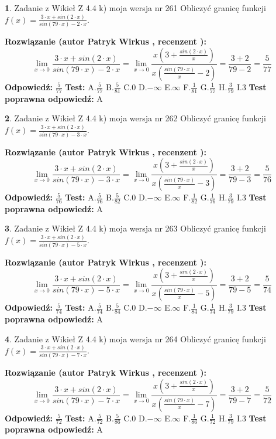\documentclass[12pt, a4paper]{article}
\theoremstyle{definition} %
\newtheorem{zad}{}
\newcommand{\zadStart}[1]{\begin{zad}#1\newline}
\newcommand{\zadStop}{\end{zad}}
\newcommand{\rozwStart}[2]{\noindent \textbf{Rozwiązanie (autor #1 , recenzent #2): }\newline}
\newcommand{\rozwStop}{\newline}
\newcommand{\odpStart}{\noindent \textbf{Odpowiedź:}\newline}
\newcommand{\odpStop}{\newline}
\newcommand{\testStart}{\noindent \textbf{Test:}\newline}
\newcommand{\testStop}{\newline}
\newcommand{\kluczStart}{\noindent \textbf{Test poprawna odpowiedź:}\newline}
\newcommand{\kluczStop}{\newline}
\begin{document}
\zadStart{Zadanie z Wikieł Z 4.4 k) moja wersja nr 261}
Obliczyć granicę funkcji $f(x)=\frac{3\cdot x +sin(2\cdot x)}{sin(79\cdot x) -2\cdot x}$.
\zadStop
\rozwStart{Patryk Wirkus}{}
$$\lim\limits_{x\to 0}\frac{3\cdot x +sin(2\cdot x)}{sin(79\cdot x) -2\cdot x}
=\lim\limits_{x\to 0}\frac{x(3+\frac{sin(2\cdot x)}{x})}{x(\frac{sin(79\cdot x)}{x}-2)}
=\frac{3+2}{79-2} = \frac{5}{77}$$
\rozwStop
\odpStart
$\frac{5}{77}$
\odpStop
\testStart
A.$\frac{5}{77}$
B.$\frac{5}{81}$
C.$0$
D.$-\infty$
E.$\infty$
F.$\frac{1}{81}$
G.$\frac{1}{77}$
H.$\frac{3}{79}$
I.$3$
\testStop
\kluczStart
A
\kluczStop



\zadStart{Zadanie z Wikieł Z 4.4 k) moja wersja nr 262}
Obliczyć granicę funkcji $f(x)=\frac{3\cdot x +sin(2\cdot x)}{sin(79\cdot x) -3\cdot x}$.
\zadStop
\rozwStart{Patryk Wirkus}{}
$$\lim\limits_{x\to 0}\frac{3\cdot x +sin(2\cdot x)}{sin(79\cdot x) -3\cdot x}
=\lim\limits_{x\to 0}\frac{x(3+\frac{sin(2\cdot x)}{x})}{x(\frac{sin(79\cdot x)}{x}-3)}
=\frac{3+2}{79-3} = \frac{5}{76}$$
\rozwStop
\odpStart
$\frac{5}{76}$
\odpStop
\testStart
A.$\frac{5}{76}$
B.$\frac{5}{82}$
C.$0$
D.$-\infty$
E.$\infty$
F.$\frac{1}{82}$
G.$\frac{1}{76}$
H.$\frac{3}{79}$
I.$3$
\testStop
\kluczStart
A
\kluczStop



\zadStart{Zadanie z Wikieł Z 4.4 k) moja wersja nr 263}
Obliczyć granicę funkcji $f(x)=\frac{3\cdot x +sin(2\cdot x)}{sin(79\cdot x) -5\cdot x}$.
\zadStop
\rozwStart{Patryk Wirkus}{}
$$\lim\limits_{x\to 0}\frac{3\cdot x +sin(2\cdot x)}{sin(79\cdot x) -5\cdot x}
=\lim\limits_{x\to 0}\frac{x(3+\frac{sin(2\cdot x)}{x})}{x(\frac{sin(79\cdot x)}{x}-5)}
=\frac{3+2}{79-5} = \frac{5}{74}$$
\rozwStop
\odpStart
$\frac{5}{74}$
\odpStop
\testStart
A.$\frac{5}{74}$
B.$\frac{5}{84}$
C.$0$
D.$-\infty$
E.$\infty$
F.$\frac{1}{84}$
G.$\frac{1}{74}$
H.$\frac{3}{79}$
I.$3$
\testStop
\kluczStart
A
\kluczStop



\zadStart{Zadanie z Wikieł Z 4.4 k) moja wersja nr 264}
Obliczyć granicę funkcji $f(x)=\frac{3\cdot x +sin(2\cdot x)}{sin(79\cdot x) -7\cdot x}$.
\zadStop
\rozwStart{Patryk Wirkus}{}
$$\lim\limits_{x\to 0}\frac{3\cdot x +sin(2\cdot x)}{sin(79\cdot x) -7\cdot x}
=\lim\limits_{x\to 0}\frac{x(3+\frac{sin(2\cdot x)}{x})}{x(\frac{sin(79\cdot x)}{x}-7)}
=\frac{3+2}{79-7} = \frac{5}{72}$$
\rozwStop
\odpStart
$\frac{5}{72}$
\odpStop
\testStart
A.$\frac{5}{72}$
B.$\frac{5}{86}$
C.$0$
D.$-\infty$
E.$\infty$
F.$\frac{1}{86}$
G.$\frac{1}{72}$
H.$\frac{3}{79}$
I.$3$
\testStop
\kluczStart
A
\kluczStop
\end{document}
